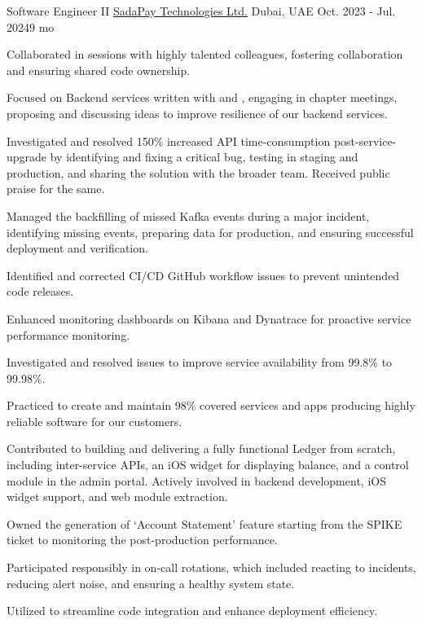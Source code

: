 \begin{cventries}
  \cventry
  {Software Engineer II} %
  {\href{https://sadapay.pk/}{SadaPay Technologies Ltd.}} %
  {Dubai, UAE} %
  {Oct. 2023 - Jul. 2024{\enskip\cdotp\enskip}9 mo} %
  {
    \begin{cvitems} %
      \item {Collaborated in  sessions with highly talented colleagues, fostering collaboration and ensuring shared code ownership.}
      \item {Focused on Backend services written with  and , engaging in chapter meetings, proposing and discussing ideas to improve resilience of our backend services.}
      \item {Investigated and resolved 150\% increased API time-consumption post-service-upgrade by identifying and fixing a critical bug, testing in staging and production, and sharing the solution with the broader team. Received public praise for the same.}
      \item {Managed the backfilling of missed Kafka events during a major incident, identifying missing events, preparing data for production, and ensuring successful deployment and verification.}
      \item {Identified and corrected CI/CD GitHub workflow issues to prevent unintended code releases.}
      \item {Enhanced monitoring dashboards on Kibana and Dynatrace for proactive service performance monitoring.}
      \item {Investigated and resolved issues to improve service availability from 99.8\% to 99.98\%.}
      \item {Practiced  to create and maintain 98\% covered services and apps producing highly reliable software for our customers.}
      \item {Contributed to building and delivering a fully functional Ledger from scratch, including inter-service APIs, an iOS widget for displaying balance, and a control module in the admin portal. Actively involved in backend development, iOS widget support, and web module extraction.}
      \item {Owned the generation of `Account Statement' feature starting from the SPIKE ticket to monitoring the post-production performance.}
      \item {Participated responsibly in on-call rotations, which included reacting to incidents, reducing alert noise, and ensuring a healthy system state.}
      \item {Utilized  to streamline code integration and enhance deployment efficiency.}
    \end{cvitems}
  }
      

\end{cventries}
